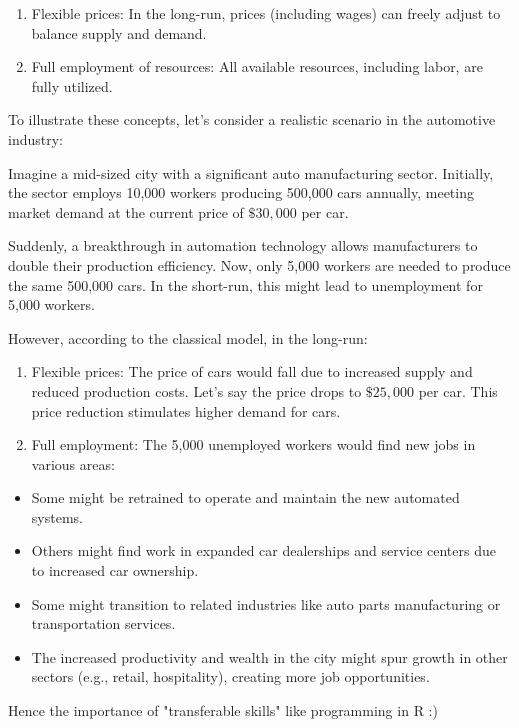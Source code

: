 \documentclass[10pt]{article}
\begin{document}
\begin{enumerate}
  \item Flexible prices: In the long-run, prices (including wages) can freely adjust to balance supply and demand.
  \item Full employment of resources: All available resources, including labor, are fully utilized.
\end{enumerate}

To illustrate these concepts, let's consider a realistic scenario in the automotive industry:

\vspace{0.5cm}
Imagine a mid-sized city with a significant auto manufacturing sector. Initially, the sector employs 10,000 workers producing 500,000 cars annually, meeting market demand at the current price of $\$ 30,000$ per car.

Suddenly, a breakthrough in automation technology allows manufacturers to double their production efficiency. Now, only 5,000 workers are needed to produce the same 500,000 cars. In the short-run, this might lead to unemployment for 5,000 workers.

However, according to the classical model, in the long-run:

\begin{enumerate}
  \item Flexible prices: The price of cars would fall due to increased supply and reduced production costs. Let's say the price drops to $\$ 25,000$ per car. This price reduction stimulates higher demand for cars.
  \item Full employment: The 5,000 unemployed workers would find new jobs in various areas:
\end{enumerate}

\begin{itemize}
  \item Some might be retrained to operate and maintain the new automated systems.
  \item Others might find work in expanded car dealerships and service centers due to increased car ownership.
  \item Some might transition to related industries like auto parts manufacturing or transportation services.
  \item The increased productivity and wealth in the city might spur growth in other sectors (e.g., retail, hospitality), creating more job opportunities.
\end{itemize}

Hence the importance of "transferable skills" like programming in $\mathrm{R}$ :)
\end{document}
